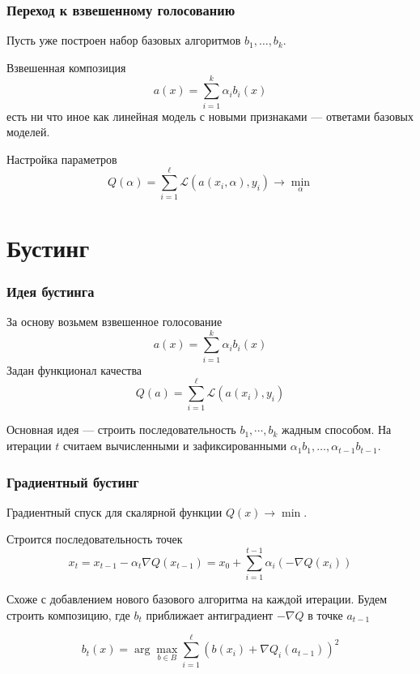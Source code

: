 \documentclass{beamer}
\begin{document}
	\begin{frame}
		\frametitle{Переход к взвешенному голосованию}

		Пусть уже построен набор базовых алгоритмов $b_1, \dots, b_k$.

		Взвешенная композиция
		\[
		a(x) = \sum_{i=1}^{k} \alpha_i b_i(x)
		\]
		есть ни что иное как линейная модель с новыми признаками --- ответами базовых моделей.

		\vspace{15pt}

		Настройка параметров
		\[
		Q(\alpha) = \sum_{i=1}^{\ell} \mathcal{L} (a(x_i, \alpha), y_i) \rightarrow \min_{\alpha}
		\]
	\end{frame}

	\section{Бустинг}

	\begin{frame}
		\frametitle{Идея бустинга}

		За основу возьмем взвешенное голосование
		\[
		a(x) = \sum_{i=1}^{k} \alpha_i b_i(x)
		\]
		Задан функционал качества
		\[
		Q(a) = \sum_{i=1}^{\ell} \mathcal{L} (a(x_i), y_i)
		\] 

		Основная идея --- строить последовательность $b_1, \cdots, b_k$ жадным способом.
		На итерации $t$ считаем вычисленными и зафиксированными $\alpha_1 b_1, \dots, \alpha_{t-1}b_{t-1}$.
	\end{frame}

	\begin{frame}
		\frametitle{Градиентный бустинг}
		Градиентный спуск для скалярной функции $Q(x) \rightarrow \min$.

		Строится последовательность точек
		\[
		x_t = x_{t-1} - \alpha_t \nabla Q(x_{t-1}) = x_0 + \sum_{i=1}^{t-1} \alpha_i ( - \nabla Q(x_i))
		\]

		Схоже с добавлением нового базового алгоритма на каждой итерации.
		Будем строить композицию, где $b_t$ приближает антиградиент $-\nabla Q$ в точке $a_{t-1}$

		\[
		b_t(x) = \arg \max_{b \in B} \sum_{i=1}^{\ell} (b(x_i) + \nabla Q_i(a_{t-1}))^2
		\]
	\end{frame}

	
\end{document}
